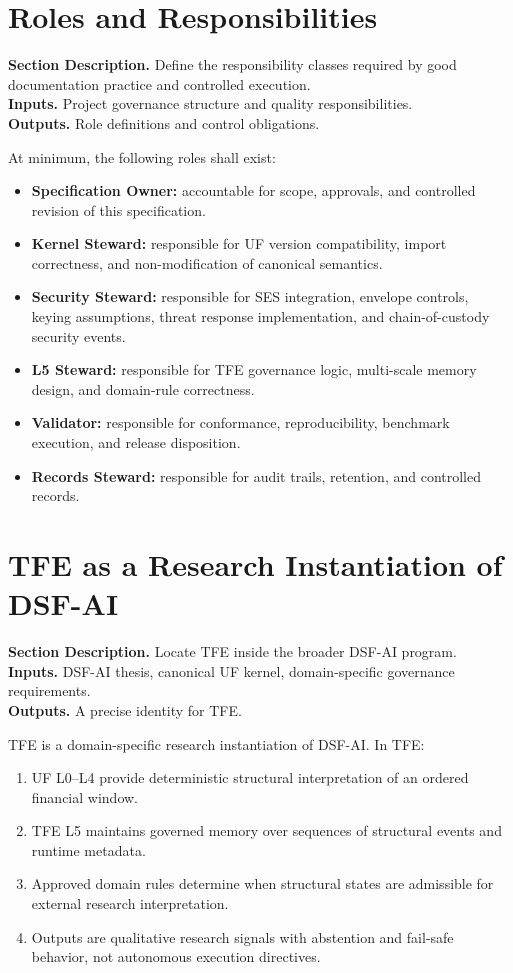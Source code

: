 \documentclass[11pt]{report}
\newcommand{\meta}[3]{\textbf{Section Description.} #1\\
\textbf{Inputs.} #2\\
\textbf{Outputs.} #3\par}
\begin{document}
\section{Roles and Responsibilities}
\meta{Define the responsibility classes required by good documentation practice and controlled execution.}{Project governance structure and quality responsibilities.}{Role definitions and control obligations.}

At minimum, the following roles shall exist:
\begin{itemize}
    \item \textbf{Specification Owner:} accountable for scope, approvals, and controlled revision of this specification.
    \item \textbf{Kernel Steward:} responsible for UF version compatibility, import correctness, and non-modification of canonical semantics.
    \item \textbf{Security Steward:} responsible for SES integration, envelope controls, keying assumptions, threat response implementation, and chain-of-custody security events.
    \item \textbf{L5 Steward:} responsible for TFE governance logic, multi-scale memory design, and domain-rule correctness.
    \item \textbf{Validator:} responsible for conformance, reproducibility, benchmark execution, and release disposition.
    \item \textbf{Records Steward:} responsible for audit trails, retention, and controlled records.
\end{itemize}

\section{TFE as a Research Instantiation of DSF-AI}
\meta{Locate TFE inside the broader DSF-AI program.}{DSF-AI thesis, canonical UF kernel, domain-specific governance requirements.}{A precise identity for TFE.}

TFE is a domain-specific research instantiation of DSF-AI. In TFE:
\begin{enumerate}[leftmargin=1.2cm]
    \item UF L0--L4 provide deterministic structural interpretation of an ordered financial window.
    \item TFE L5 maintains governed memory over sequences of structural events and runtime metadata.
    \item Approved domain rules determine when structural states are admissible for external research interpretation.
    \item Outputs are qualitative research signals with abstention and fail-safe behavior, not autonomous execution directives.
\end{enumerate}
\end{document}
